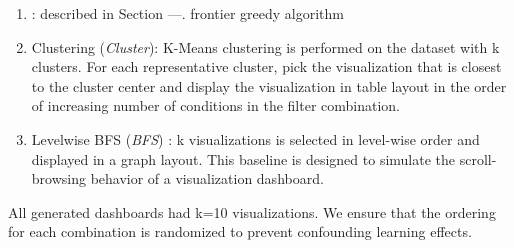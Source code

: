 \begin{enumerate}
	\item \system : described in Section ---. frontier greedy algorithm
	\item Clustering (\textit{Cluster}): K-Means clustering is performed on the dataset with k clusters. For each representative cluster, pick the visualization that is closest to the cluster center and display the visualization in table layout in the order of increasing number of conditions in the filter combination.
	\item Levelwise BFS (\textit{BFS}) : k visualizations is selected in level-wise order and displayed in a graph layout. This baseline is designed to simulate the scroll-browsing behavior of a visualization dashboard.
\end{enumerate}
All generated dashboards had k=10 visualizations. We ensure that the ordering for each combination is randomized to prevent confounding learning effects. 

